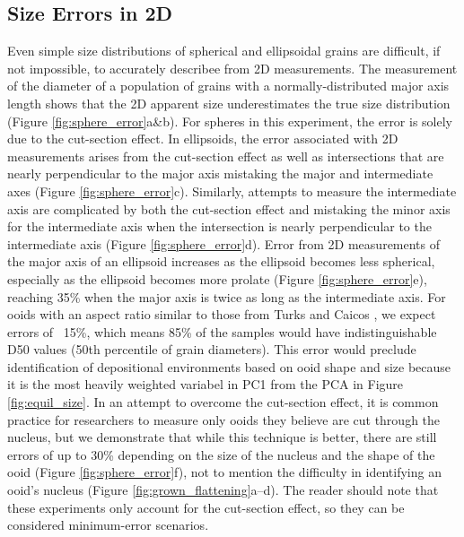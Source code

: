 \documentclass[draft]{agujournal2019}
\begin{document}
\subsection{Size Errors in 2D}
Even simple size distributions of spherical and ellipsoidal grains are difficult, if not impossible, to accurately describee from 2D measurements. The measurement of the diameter of a population of grains with a normally-distributed major axis length shows that the 2D apparent size underestimates the true size distribution (Figure \ref{fig:sphere_error}a\&b). For spheres in this experiment, the error is solely due to the cut-section effect. In ellipsoids, the error associated with 2D measurements arises from the cut-section effect as well as intersections that are nearly perpendicular to the major axis mistaking the major and intermediate axes (Figure \ref{fig:sphere_error}c). Similarly, attempts to measure the intermediate axis are complicated by both the cut-section effect and mistaking the minor axis for the intermediate axis when the intersection is nearly perpendicular to the intermediate axis (Figure \ref{fig:sphere_error}d). Error from 2D measurements of the major axis of an ellipsoid increases as the ellipsoid becomes less spherical, especially as the ellipsoid becomes more prolate (Figure \ref{fig:sphere_error}e), reaching 35\% when the major axis is twice as long as the intermediate axis. For ooids with an aspect ratio similar to those from Turks and Caicos \cite{trower2018active}, we expect errors of ~15\%, which means 85\% of the samples would have indistinguishable D50 values (50th percentile of grain diameters). This error would preclude identification of depositional environments based on ooid shape and size because it is the most heavily weighted variabel in PC1 from the PCA in Figure \ref{fig:equil_size}. In an attempt to overcome the cut-section effect, it is common practice for researchers to measure only ooids they believe are cut through the nucleus, but we demonstrate that while this technique is better, there are still errors of up to 30\% depending on the size of the nucleus and the shape of the ooid (Figure \ref{fig:sphere_error}f), not to mention the difficulty in identifying an ooid's nucleus (Figure \ref{fig:grown_flattening}a--d). The reader should note that these experiments only account for the cut-section effect, so they can be considered minimum-error scenarios. 
\end{document}

